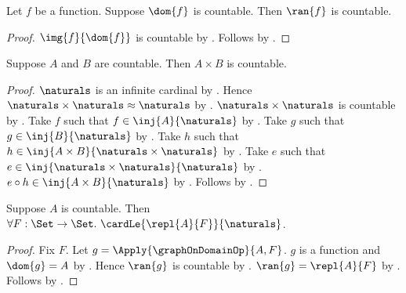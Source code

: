 \begin{corollary}\label{countable_function_range}
    Let $f$ be a function.
    Suppose $\dom{f}$ is countable.
    Then $\ran{f}$ is countable.
\end{corollary}
\begin{proof}
    $\img{f}{\dom{f}}$ is countable by .
    Follows by .
\end{proof}

\begin{theorem}\label{product_of_countable_sets_is_countable}
    Suppose $A$ and $B$ are countable.
    Then $A\times B$ is countable.
\end{theorem}
\begin{proof}
    $\naturals$ is an infinite cardinal by .
    Hence $\naturals\times\naturals\approx\naturals$ by .
    $\naturals\times\naturals$ is countable by .
    Take $f$ such that $f\in\inj{A}{\naturals}$ by .
    Take $g$ such that $g\in\inj{B}{\naturals}$ by .
    Take $h$ such that $h\in\inj{A\times B}{\naturals\times\naturals}$
        by .
    Take $e$ such that $e\in\inj{\naturals\times\naturals}{\naturals}$
        by .
    $e\circ h\in\inj{A\times B}{\naturals}$ by .
    Follows by .
\end{proof}

\begin{theorem}\label{countable_replacement}
    Suppose $A$ is countable.
    Then $\forall F:\Set\to\Set.\ \cardLe{\repl{A}{F}}{\naturals}$.
\end{theorem}
\begin{proof}
    Fix $F$.
    Let $g=\Apply{\graphOnDomainOp}{A,F}$.
    $g$ is a function and $\dom{g}=A$ by
        .
    Hence $\ran{g}$ is countable by .
    $\ran{g}=\repl{A}{F}$ by
        .
    Follows by .
\end{proof}

